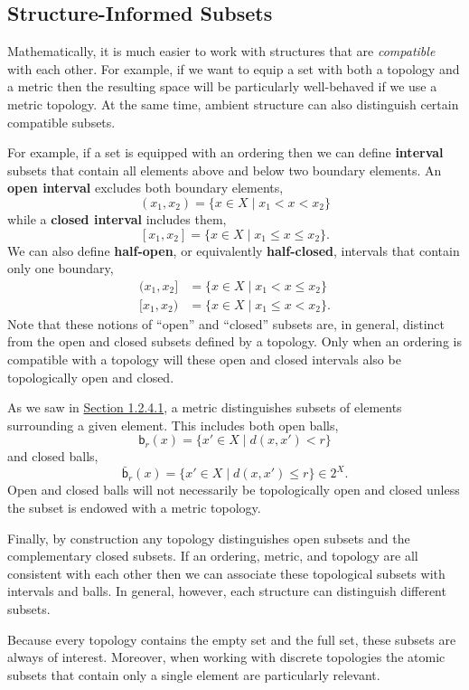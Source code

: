 \documentclass[
  letterpaper,
  DIV=11,
  numbers=noendperiod]{scrartcl}
\begin{document}
\subsection{Structure-Informed
Subsets}\label{structure-informed-subsets}

Mathematically, it is much easier to work with structures that are
\emph{compatible} with each other. For example, if we want to equip a
set with both a topology and a metric then the resulting space will be
particularly well-behaved if we use a metric topology. At the same time,
ambient structure can also distinguish certain compatible subsets.

For example, if a set is equipped with an ordering then we can define
\textbf{interval} subsets that contain all elements above and below two
boundary elements. An \textbf{open interval} excludes both boundary
elements, \[
(x_{1}, x_{2}) =
\{ x \in X \mid x_{1} < x < x_{2} \}
\] while a \textbf{closed interval} includes them, \[
[x_{1}, x_{2}] =
\{ x \in X \mid x_{1} \le x \le x_{2} \}.
\] We can also define \textbf{half-open}, or equivalently
\textbf{half-closed}, intervals that contain only one boundary,
\begin{align*}
(x_{1}, x_{2}] &= \{ x \in X \mid x_{1} < x \le x_{2} \}
\\
[x_{1}, x_{2}) &= \{ x \in X \mid x_{1} \le x < x_{2} \}.
\end{align*} Note that these notions of ``open'' and ``closed'' subsets
are, in general, distinct from the open and closed subsets defined by a
topology. Only when an ordering is compatible with a topology will these
open and closed intervals also be topologically open and closed.

As we saw in \hyperref[sec:open-balls]{Section 1.2.4.1}, a metric
distinguishes subsets of elements surrounding a given element. This
includes both open balls, \[
\mathsf{b}_{r}(x)
=
\{ x' \in X \mid d(x, x') < r \}
\] and closed balls, \[
\bar{\mathsf{b}}_{r}(x)
=
\{ x' \in X \mid d(x, x') \le r \} \in 2^{X}.
\] Open and closed balls will not necessarily be topologically open and
closed unless the subset is endowed with a metric topology.

Finally, by construction any topology distinguishes open subsets and the
complementary closed subsets. If an ordering, metric, and topology are
all consistent with each other then we can associate these topological
subsets with intervals and balls. In general, however, each structure
can distinguish different subsets.

Because every topology contains the empty set and the full set, these
subsets are always of interest. Moreover, when working with discrete
topologies the atomic subsets that contain only a single element are
particularly relevant.
\end{document}
